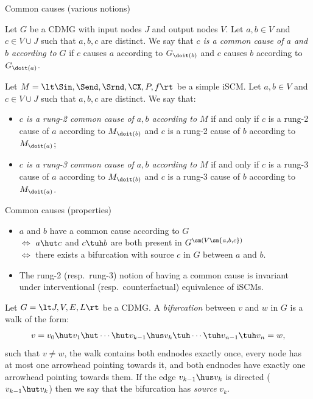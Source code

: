 \begin{frame}{Common causes (various notions)}
\begin{Def}[\ref{def:graph_common_cause_of}]
  Let $G$ be a CDMG with input nodes $J$ and output nodes $V$.
  Let $a, b \in V$ and $c \in V \cup J$ such that $a,b,c$ are distinct.
  We say that \emph{$c$ is a common cause of $a$ and $b$ according to $G$} if $c$ causes $a$ according to $G_{\doit(b)}$ and $c$ causes $b$ according to $G_{\doit(a)}$.
\end{Def}
\begin{Def}[\ref{def:scm_rung2_common_cause_of}, \ref{def:scm_rung3_common_cause_of}]
  Let $M = \lt \Sin, \Send, \Srnd, \CX, P, f \rt$ be a simple iSCM.
  Let $a, b \in V$ and $c \in V \cup J$ such that $a,b,c$ are distinct.
  We say that:
  \begin{itemize}
    \item \emph{$c$ is a rung-2 common cause of $a,b$ according to $M$} if and only if $c$ is a rung-2 cause of $a$ according to $M_{\doit(b)}$ and $c$ is a rung-2 cause of $b$ according to $M_{\doit(a)}$;
    \item \emph{$c$ is a rung-3 common cause of $a,b$ according to $M$} if and only if $c$ is a rung-3 cause of $a$ according to $M_{\doit(b)}$ and $c$ is a rung-3 cause of $b$ according to $M_{\doit(a)}$.
  \end{itemize}
\end{Def}
\end{frame}

\begin{frame}{Common causes (properties)}
  \begin{itemize}
    \item
     $a$ and $b$ have a common cause according to $G$\\
     $\iff$ $a \hut c$ and $c \tuh b$ are both present in $G^{\sm(V \sm \{a,b,c\})}$ \\
     $\iff$ there exists a bifurcation with source $c$ in $G$ between $a$ and $b$.
   \item
     The rung-2 (resp.\ rung-3) notion of having a common cause is invariant under interventional (resp.\ counterfactual) equivalence of iSCMs.
  \end{itemize}
\begin{Def}
    Let $G = \lt J, V, E, L \rt$ be a CDMG. 
    A \emph{bifurcation} between $v$ and $w$ in $G$ is a walk of the form:
        \[v=v_0 \hut v_1 \hut  \cdots \hut v_{k-1} \hus v_k  \tuh \cdots \tuh v_{n-1} \tuh v_n=w,\]
        such that $v \ne w$, the walk contains both endnodes exactly once, 
        every node has at most one arrowhead pointing towards it, and 
        both endnodes have exactly one arrowhead pointing towards them. 
          If the edge $v_{k-1} \hus v_k$ is directed ($v_{k-1} \hut v_k$) then we say that the bifurcation has \emph{source} $v_{k}$.
  \end{Def}
\end{frame}

